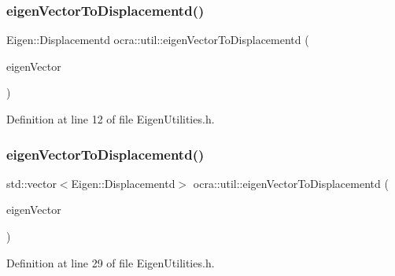 \subsubsection{\texorpdfstring{eigen\+Vector\+To\+Displacementd()}{eigenVectorToDisplacementd()}\hspace{0.1cm}{\footnotesize\ttfamily [1/2]}}
{\footnotesize\ttfamily Eigen\+::\+Displacementd ocra\+::util\+::eigen\+Vector\+To\+Displacementd (\begin{DoxyParamCaption}\item[{const Eigen\+::\+Vector\+Xd \&}]{eigen\+Vector }\end{DoxyParamCaption})\hspace{0.3cm}{\ttfamily [inline]}}



Definition at line 12 of file Eigen\+Utilities.\+h.

\hypertarget{namespaceocra_1_1util_aa7cf44a7c937b97604d2765f2283e706}{}\label{namespaceocra_1_1util_aa7cf44a7c937b97604d2765f2283e706} 
\subsubsection{\texorpdfstring{eigen\+Vector\+To\+Displacementd()}{eigenVectorToDisplacementd()}\hspace{0.1cm}{\footnotesize\ttfamily [2/2]}}
{\footnotesize\ttfamily std\+::vector$<$Eigen\+::\+Displacementd$>$ ocra\+::util\+::eigen\+Vector\+To\+Displacementd (\begin{DoxyParamCaption}\item[{const std\+::vector$<$ Eigen\+::\+Vector\+Xd $>$ \&}]{eigen\+Vector }\end{DoxyParamCaption})\hspace{0.3cm}{\ttfamily [inline]}}



Definition at line 29 of file Eigen\+Utilities.\+h.

\hypertarget{namespaceocra_1_1util_acc4ef0218e3bb719ff6444afbed77c71}{}\label{namespaceocra_1_1util_acc4ef0218e3bb719ff6444afbed77c71} 
